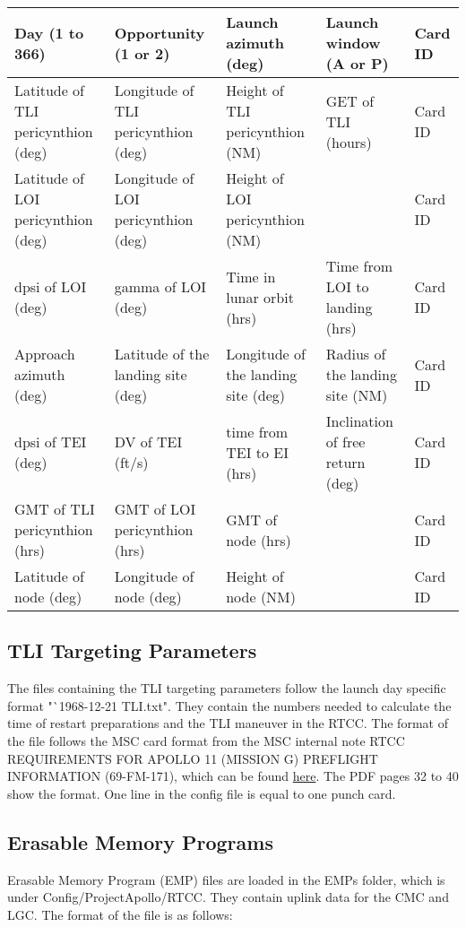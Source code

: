 \documentclass[11pt]{article} %
\begin{document}
\begin{tabular}{|L{2.9cm}|L{2.9cm}|L{2.8cm}|L{2.8cm}|L{1.4cm}|}
\hline
Day (1 to 366)&Opportunity (1 or 2)&Launch azimuth (deg)&Launch window (A or P)&Card ID\\
\hline
Latitude of TLI pericynthion (deg)&Longitude of TLI pericynthion (deg)&Height of TLI pericynthion (NM)&GET of TLI (hours)&Card ID\\
\hline
Latitude of LOI pericynthion (deg)&Longitude of LOI pericynthion (deg)&Height of LOI pericynthion (NM)&&Card ID\\
\hline
dpsi of LOI (deg)&gamma of LOI (deg)&Time in lunar orbit (hrs)&Time from LOI to landing (hrs)&Card ID\\
\hline
Approach azimuth (deg)&Latitude of the landing site (deg)&Longitude of the landing site (deg)&Radius of the landing site (NM)&Card ID\\
\hline
dpsi of TEI (deg)&DV of TEI (ft/s)&time from TEI to EI (hrs)&Inclination of free return (deg)&Card ID\\
\hline
GMT of TLI pericynthion (hrs)&GMT of LOI pericynthion (hrs)&GMT of node (hrs)&&Card ID\\
\hline
Latitude of node (deg)&Longitude of node (deg)&Height of node (NM)&&Card ID\\
\hline
\end{tabular}

\newpage
\subsection{TLI Targeting Parameters}

The files containing the TLI targeting parameters follow the launch day specific format "`1968-12-21 TLI.txt". They contain the numbers needed to calculate the time of restart preparations and the TLI maneuver in the RTCC. The format of the file follows the MSC card format from the MSC internal note RTCC REQUIREMENTS FOR APOLLO 11 (MISSION G) PREFLIGHT INFORMATION (69-FM-171), which can be found \href{https://web.archive.org/web/20100524010957/http://ntrs.nasa.gov/archive/nasa/casi.ntrs.nasa.gov/19740072570_1974072570.pdf}{here}. The PDF pages 32 to 40 show the format. One line in the config file is equal to one punch card.


\newpage
\subsection{Erasable Memory Programs}

Erasable Memory Program (EMP) files are loaded in the EMPs folder, which is under Config/ProjectApollo/RTCC. They contain uplink data for the CMC and LGC. The format of the file is as follows:\\
\end{document}
